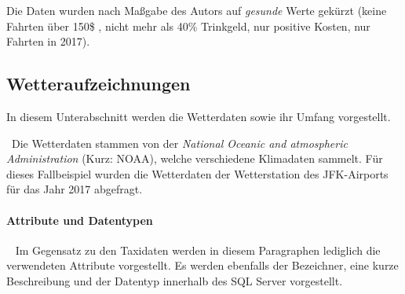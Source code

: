 Die Daten wurden nach Maßgabe des Autors auf \textit{gesunde} Werte gekürzt (keine Fahrten über 150\$ , nicht mehr als 40\% Trinkgeld, nur positive Kosten, nur Fahrten in 2017).
\subsection{Wetteraufzeichnungen}
\label{subsec:Wetterdaten}
In diesem Unterabschnitt werden die Wetterdaten sowie ihr Umfang vorgestellt. 

~\newline Die Wetterdaten stammen von der \textit{National Oceanic and atmospheric Administration} \cite{SourceWeather} (Kurz: NOAA), welche verschiedene Klimadaten sammelt. Für dieses Fallbeispiel wurden die Wetterdaten der Wetterstation des JFK-Airports für das Jahr 2017 abgefragt. 

\paragraph{Attribute und Datentypen} ~\newline
Im Gegensatz zu den Taxidaten werden in diesem Paragraphen lediglich die verwendeten Attribute vorgestellt. Es werden ebenfalls der Bezeichner, eine kurze Beschreibung und der Datentyp innerhalb des SQL Server vorgestellt. 

